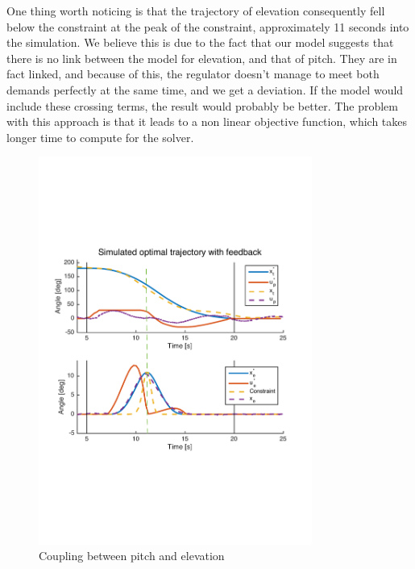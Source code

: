 One thing worth noticing is that the trajectory of elevation consequently fell below the constraint at the peak of the constraint, approximately 11 seconds into the simulation. We believe this is due to the fact that our model suggests that there is no link between the model for elevation, and that of pitch. They are in fact linked, and because of this, the regulator doesn't manage to meet both demands perfectly at the same time, and we get a deviation. If the model would include these crossing terms, the result would probably be better. The problem with this approach is that it leads to a non linear objective function, which takes longer time to compute for the solver.
\begin{figure}[ht!]
    \centering
     \includegraphics[width=0.8\textwidth]{figures/day4_cl/plot_day4_CL_q_20_1_1_1_20_1_marked2}
    \caption{Coupling between pitch and elevation}
    \label{fig:coupling_pitch_elev}
\end{figure}